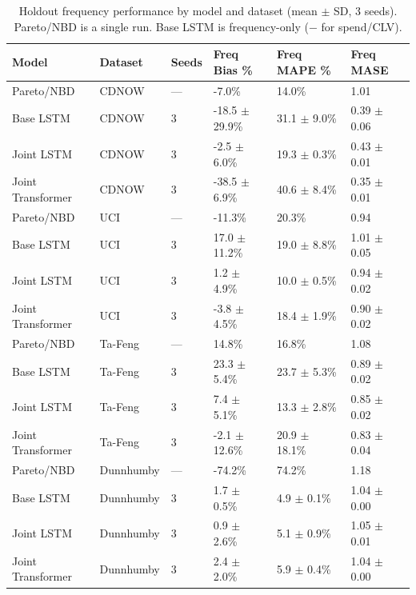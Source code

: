 \begin{table}
\centering
\small
\caption{Holdout frequency performance by model and dataset (mean $\pm$ SD, 3 seeds). Pareto/NBD is a single run. Base LSTM is frequency-only ($-$ for spend/CLV).}
\label{tab:headline_summary_freq}
\begin{tabular}{llllll}
\toprule
Model & Dataset & Seeds & Freq Bias \% & Freq MAPE \% & Freq MASE \\
\midrule
Pareto/NBD & CDNOW & — & -7.0\% & 14.0\% & 1.01 \\
Base LSTM & CDNOW & 3 & -18.5 $\pm$ 29.9\% & 31.1 $\pm$ 9.0\% & 0.39 $\pm$ 0.06 \\
Joint LSTM & CDNOW & 3 & -2.5 $\pm$ 6.0\% & 19.3 $\pm$ 0.3\% & 0.43 $\pm$ 0.01 \\
Joint Transformer & CDNOW & 3 & -38.5 $\pm$ 6.9\% & 40.6 $\pm$ 8.4\% & 0.35 $\pm$ 0.01 \\
Pareto/NBD & UCI & — & -11.3\% & 20.3\% & 0.94 \\
Base LSTM & UCI & 3 & 17.0 $\pm$ 11.2\% & 19.0 $\pm$ 8.8\% & 1.01 $\pm$ 0.05 \\
Joint LSTM & UCI & 3 & 1.2 $\pm$ 4.9\% & 10.0 $\pm$ 0.5\% & 0.94 $\pm$ 0.02 \\
Joint Transformer & UCI & 3 & -3.8 $\pm$ 4.5\% & 18.4 $\pm$ 1.9\% & 0.90 $\pm$ 0.02 \\
Pareto/NBD & Ta-Feng & — & 14.8\% & 16.8\% & 1.08 \\
Base LSTM & Ta-Feng & 3 & 23.3 $\pm$ 5.4\% & 23.7 $\pm$ 5.3\% & 0.89 $\pm$ 0.02 \\
Joint LSTM & Ta-Feng & 3 & 7.4 $\pm$ 5.1\% & 13.3 $\pm$ 2.8\% & 0.85 $\pm$ 0.02 \\
Joint Transformer & Ta-Feng & 3 & -2.1 $\pm$ 12.6\% & 20.9 $\pm$ 18.1\% & 0.83 $\pm$ 0.04 \\
Pareto/NBD & Dunnhumby & — & -74.2\% & 74.2\% & 1.18 \\
Base LSTM & Dunnhumby & 3 & 1.7 $\pm$ 0.5\% & 4.9 $\pm$ 0.1\% & 1.04 $\pm$ 0.00 \\
Joint LSTM & Dunnhumby & 3 & 0.9 $\pm$ 2.6\% & 5.1 $\pm$ 0.9\% & 1.05 $\pm$ 0.01 \\
Joint Transformer & Dunnhumby & 3 & 2.4 $\pm$ 2.0\% & 5.9 $\pm$ 0.4\% & 1.04 $\pm$ 0.00 \\
\bottomrule
\end{tabular}
\end{table}
